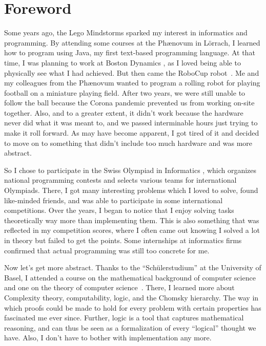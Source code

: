 \chapter*{Foreword}

Some years ago, the Lego Mindstorms \cite{lego} sparked my interest in informatics and programming.
By attending some courses at the Phænovum \cite{phaenovum} in Lörrach, I learned how to program using Java, my first text-based programming language.
At that time, I was planning to work at Boston Dynamics \cite{boston}, as I loved being able to physically see what I had achieved.
But then came the RoboCup robot~\cite{roboCup}.
Me and my colleagues from the Phænovum wanted to program a rolling robot for playing football on a miniature playing field.
After two years, we were still unable to follow the ball because the Corona pandemic prevented us from working on-site together.
Also, and to a greater extent, it didn't work because the hardware never did what it was meant to, and we passed interminable hours just trying to make it roll forward.
As may have become apparent, I got tired of it and decided to move on to something that didn't include too much hardware and was more abstract.

So I chose to participate in the Swiss Olympiad in Informatics \cite{soi}, which organizes national programming contests and selects various teams for international Olympiads.
There, I got many interesting problems which I loved to solve, found like-minded friends, and was able to participate in some international competitions.
Over the years, I began to notice that I enjoy solving tasks theoretically way more than implementing them.
This is also something that was reflected in my competition scores, where I often came out knowing I solved a lot in theory but failed to get the points.
Some internships at informatics firms confirmed that actual programming was still too concrete for me.

Now let's get more abstract.
Thanks to the ``Schülerstudium'' at the University of Basel, I attended a course on the mathematical background of computer science~\cite{discrete-maths} and one on the theory of computer science~\cite{theory-cs}.
There, I learned more about Complexity theory, computability, logic, and the Chomsky hierarchy.
The way in which proofs could be made to hold for every problem with certain properties has fascinated me ever since.
Further, logic is a tool that captures mathematical reasoning, and can thus be seen as a formalization of every ``logical'' thought we have.
Also, I don't have to bother with implementation any more.

